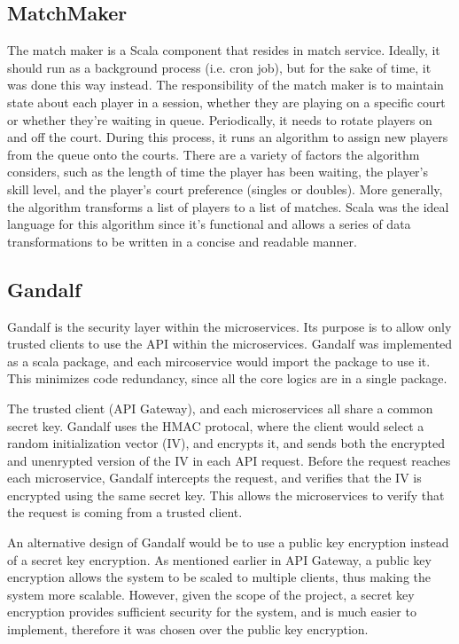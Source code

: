 \documentclass{article}
\begin{document}
\subsection{MatchMaker}
The match maker is a Scala component that resides in match service. Ideally, it should run as a background process (i.e. cron job), but for the sake of time, it was done this way instead. The responsibility of the match maker is to maintain state about each player in a session, whether they are playing on a specific court or whether they're waiting in queue. Periodically, it needs to rotate players on and off the court. During this process, it runs an algorithm to assign new players from the queue onto the courts. There are a variety of factors the algorithm considers, such as the length of time the player has been waiting, the player's skill level, and the player's court preference (singles or doubles). More generally, the algorithm transforms a list of players to a list of matches. Scala was the ideal language for this algorithm since it's functional and allows a series of data transformations to be written in a concise and readable manner.

\subsection{Gandalf}
Gandalf is the security layer within the microservices. Its purpose is to allow only trusted clients to use the API within the microservices. Gandalf was implemented as a scala package, and each mircoservice would import the package to use it. This minimizes code redundancy, since all the core logics are in a single package.

The trusted client (API Gateway), and each microservices all share a common secret key. Gandalf uses the HMAC protocal, where the client would select a random initialization vector (IV), and encrypts it, and sends both the encrypted and unenrypted version of the IV in each API request. Before the request reaches each microservice, Gandalf intercepts the request, and verifies that the IV is encrypted using the same secret key. This allows the microservices to verify that the request is coming from a trusted client.

An alternative design of Gandalf would be to use a public key encryption instead of a secret key encryption. As mentioned earlier in API Gateway, a public key encryption allows the system to be scaled to multiple clients, thus making the system more scalable. However, given the scope of the project, a secret key encryption provides sufficient security for the system, and is much easier to implement, therefore it was chosen over the public key encryption.
\end{document}
